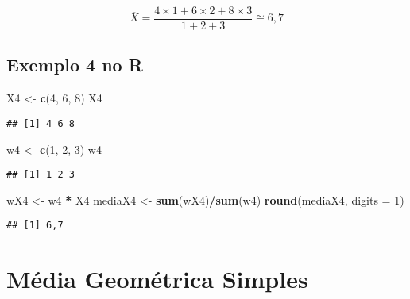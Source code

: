 \documentclass[
]{book}
\newenvironment{Shaded}{\begin{snugshade}}{\end{snugshade}}
\newcommand{\DataTypeTok}[1]{\textcolor[rgb]{0.13,0.29,0.53}{#1}}
\newcommand{\DecValTok}[1]{\textcolor[rgb]{0.00,0.00,0.81}{#1}}
\newcommand{\KeywordTok}[1]{\textcolor[rgb]{0.13,0.29,0.53}{\textbf{#1}}}
\newcommand{\NormalTok}[1]{#1}
\newcommand{\OperatorTok}[1]{\textcolor[rgb]{0.81,0.36,0.00}{\textbf{#1}}}
\newcommand{\StringTok}[1]{\textcolor[rgb]{0.31,0.60,0.02}{#1}}
\begin{document}
\begin{equation*}
  \overline{X} = \frac{4 \times 1 + 6 \times 2 + 8 \times 3}{1 + 2 + 3} \cong 6,7
\end{equation*}

\hypertarget{exemplo-4-no-r}{%
\subsection{Exemplo 4 no R}\label{exemplo-4-no-r}}

\begin{Shaded}
\begin{Highlighting}[]
\NormalTok{X4 <-}\StringTok{ }\KeywordTok{c}\NormalTok{(}\DecValTok{4}\NormalTok{, }\DecValTok{6}\NormalTok{, }\DecValTok{8}\NormalTok{)}
\NormalTok{X4}
\end{Highlighting}
\end{Shaded}

\begin{verbatim}
## [1] 4 6 8
\end{verbatim}

\begin{Shaded}
\begin{Highlighting}[]
\NormalTok{w4 <-}\StringTok{ }\KeywordTok{c}\NormalTok{(}\DecValTok{1}\NormalTok{, }\DecValTok{2}\NormalTok{, }\DecValTok{3}\NormalTok{)}
\NormalTok{w4}
\end{Highlighting}
\end{Shaded}

\begin{verbatim}
## [1] 1 2 3
\end{verbatim}

\begin{Shaded}
\begin{Highlighting}[]
\NormalTok{wX4 <-}\StringTok{ }\NormalTok{w4 }\OperatorTok{*}\StringTok{ }\NormalTok{X4}
\NormalTok{mediaX4 <-}\StringTok{ }\KeywordTok{sum}\NormalTok{(wX4)}\OperatorTok{/}\KeywordTok{sum}\NormalTok{(w4)}
\KeywordTok{round}\NormalTok{(mediaX4, }\DataTypeTok{digits =} \DecValTok{1}\NormalTok{)}
\end{Highlighting}
\end{Shaded}

\begin{verbatim}
## [1] 6,7
\end{verbatim}

\hypertarget{muxe9dia-geomuxe9trica-simples}{%
\section{Média Geométrica Simples}\label{muxe9dia-geomuxe9trica-simples}}
\end{document}
